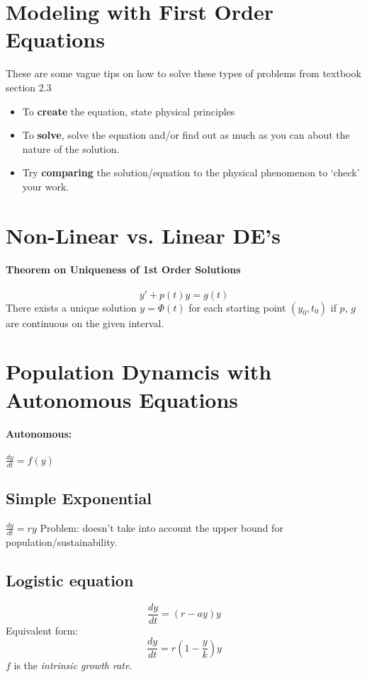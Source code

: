 \documentclass[a4paper,12pt]{report}
\begin{document}
\section{Modeling with First Order Equations}
These are some vague tips on how to solve these types of problems from textbook section 
2.3
\begin{itemize}
\item To \textbf{create} the equation, state physical principles
\item To \textbf{solve}, solve the equation and/or find out as much as you can about the nature of the solution.
\item Try \textbf{comparing} the solution/equation to the physical phenomenon to `check' your work.
\end{itemize}

\section{Non-Linear vs. Linear DE's}
\paragraph{Theorem on Uniqueness of 1st Order Solutions}
$$y' + p(t)y = g(t)$$
There exists a unique solution $y=\Phi(t)$ for each starting point $(y_0, t_0)$ if 
$p$, $g$ are continuous on the given interval.

\section{Population Dynamcis with Autonomous Equations}
\paragraph{Autonomous: } $\frac{dy}{dt} = f(y)$

\subsection{Simple Exponential}
$\frac{dy}{dt} = ry$
Problem: doesn't take into account the upper bound for population/sustainability.

\subsection{Logistic equation}
$$\frac{dy}{dt} = (r-ay)y$$
Equivalent form: 
$$\frac{dy}{dt} = r(1 - \frac{y}{k})y$$
$f$ is the \textit{intrinsic growth rate}.
\end{document}

